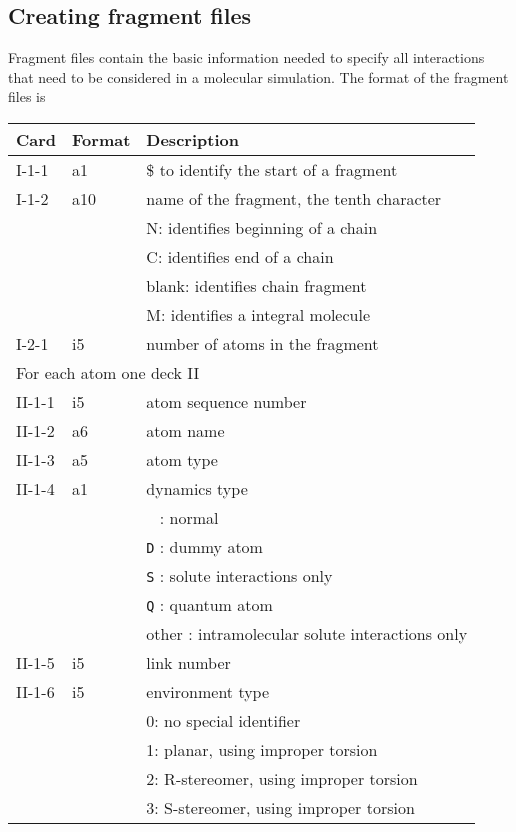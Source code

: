 \subsection{Creating fragment files}
Fragment files contain the basic information needed to specify all
interactions that need to be considered in a molecular simulation.
The format of the fragment files is
\begin{center}
\begin{tabular}{lll}
\hline\hline
Card & Format & Description \\ \hline
I-1-1  & a1     & \$ to identify the start of a fragment \\
I-1-2  & a10    & name of the fragment, the tenth character\\
       &        & N: identifies beginning of a chain\\
       &        & C: identifies end of a chain\\
       &        & blank: identifies chain fragment\\
       &        & M: identifies a integral molecule\\
\hline
I-2-1  & i5     & number of atoms in the fragment\\ 
\hline
\multicolumn{3}{l}{For each atom one deck II} \\
\hline
II-1-1  & i5     & atom sequence number \\
II-1-2  & a6     & atom name \\
II-1-3  & a5     & atom type \\
II-1-4  & a1     & dynamics type\\
        &        & \verb+ + : normal\\
        &        & \verb+D+ : dummy atom\\
        &        & \verb+S+ : solute interactions only\\
        &        & \verb+Q+ : quantum atom\\
        &        & other : intramolecular solute interactions only\\
II-1-5  & i5     & link number\\
II-1-6  & i5     & environment type\\
        &        & 0: no special identifier\\
        &        & 1: planar, using improper torsion\\
        &        & 2: R-stereomer, using improper torsion\\
        &        & 3: S-stereomer, using improper torsion\\

\end{tabular}
\end{center}
